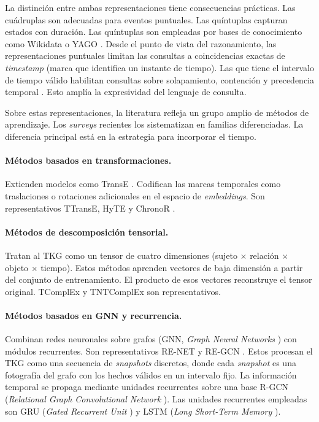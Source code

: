 La distinción entre ambas representaciones tiene consecuencias prácticas. Las cuádruplas son adecuadas para eventos puntuales. Las quíntuplas capturan estados con duración. Las quíntuplas son empleadas por bases de conocimiento como Wikidata o YAGO \cite{tkgc_survey2023}. Desde el punto de vista del razonamiento, las representaciones puntuales limitan las consultas a coincidencias exactas de \emph{timestamp} (marca que identifica un instante de tiempo). Las que tiene el intervalo de tiempo válido habilitan consultas sobre solapamiento, contención y precedencia temporal \cite{tkg_survey2024, tkgc_survey2023}. Esto amplía la expresividad del lenguaje de consulta.

Sobre estas representaciones, la literatura refleja un grupo amplio de métodos de aprendizaje. Los \emph{surveys} recientes \cite{tkg_survey2024, tkgc_survey2023} los sistematizan en familias diferenciadas. La diferencia principal está en la estrategia para incorporar el tiempo.

\paragraph{Métodos basados en transformaciones.} Extienden modelos como TransE \cite{bordes2013translating}. Codifican las marcas temporales como traslaciones o rotaciones adicionales en el espacio de \emph{embeddings}. Son representativos TTransE, HyTE y ChronoR \cite{tkg_survey2024}.

\paragraph{Métodos de descomposición tensorial.} Tratan al TKG como un tensor de cuatro dimensiones (sujeto $\times$ relación $\times$ objeto $\times$ tiempo). Estos métodos aprenden vectores de baja dimensión a partir del conjunto de entrenamiento. El producto de esos vectores reconstruye el tensor original. TComplEx \cite{tkg_survey2024} y TNTComplEx \cite{tkgc_survey2023} son representativos.

\paragraph{Métodos basados en GNN y recurrencia.} Combinan redes neuronales sobre grafos (GNN, \emph{Graph Neural Networks} \cite{scarselli2009gnn}) con módulos recurrentes. Son representativos RE-NET \cite{jin2020renet} y RE-GCN \cite{li2021regcn}. Estos procesan el TKG como una secuencia de \emph{snapshots} discretos, donde cada \emph{snapshot} es una fotografía del grafo con los hechos válidos en un intervalo fijo. La información temporal se propaga mediante unidades recurrentes sobre una base R-GCN (\emph{Relational Graph Convolutional Network} \cite{schlichtkrull2018rgcn}). Las unidades recurrentes empleadas son GRU (\emph{Gated Recurrent Unit} \cite{chung2014gru}) y LSTM (\emph{Long Short-Term Memory} \cite{hochreiter1997lstm}).

